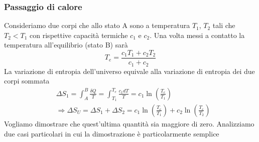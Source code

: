 \documentclass[10pt,a4paper]{article}
\begin{document}
\subsubsection{Passaggio di calore}
Consideriamo due corpi che allo stato A sono a temperatura \(T_1\), \(T_2\) tali che \(T_2<T_1\)  con rispettive capacità termiche \(c_1\) e \(c_2\). Una volta messi a contatto la temperatura all'equilibrio (stato B) sarà
\[T_e=\frac{c_1T_1 + c_2T_2}{c_1+c_2}\]
La variazione di entropia dell'universo equivale alla variazione di entropia dei due corpi sommata
\begin{align*}
	&\Delta S_1 = \int_{A}^{B}\frac{\delta Q}{T} = \int_{T_1}^{T_e}\frac{c_1 dT}{T}=c_1 \ln\left(\frac{T_e}{T_1}\right)\\
	&\Rightarrow \Delta S_U = \Delta S_1 + \Delta S_2 = c_1 \ln\left(\frac{T_e}{T_1}\right) + c_2 \ln\left(\frac{T_e}{T_2}\right)
\end{align*}
Vogliamo dimostrare che quest'ultima quantità sia maggiore di zero. Analizziamo due casi particolari in cui la dimostrazione è particolarmente semplice
\end{document}
